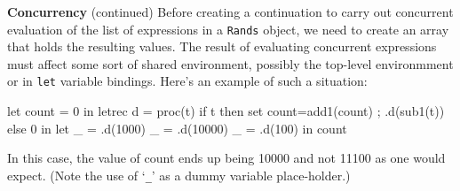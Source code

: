 \begin{minipage}[t]{\sw}
\slidenumber
\LARGE
{\bf Concurrency} (continued)\exx
Before creating a continuation
to carry out concurrent evaluation
of the list of expressions in a \verb'Rands' object,
we need to create an array that holds
the resulting values.
The result of evaluating concurrent expressions
must affect some sort of shared environment,
possibly the top-level environmment or in \verb'let' variable bindings.
Here's an example of such a situation:
\Large
\begin{qv}
let
  count = 0
in
  letrec
    d = proc(t)
      if t
      then {set count=add1(count) ; .d(sub1(t))}
      else 0
  in
    let %
      _ = .d(1000)
      _ = .d(10000)
      _ = .d(100)
    in
      count
\end{qv}
\LARGE
In this case, the value of count ends up being 10000
and not 11100 as one would expect.
(Note the use of `\verb'_'' as a dummy variable place-holder.)
\end{minipage}
